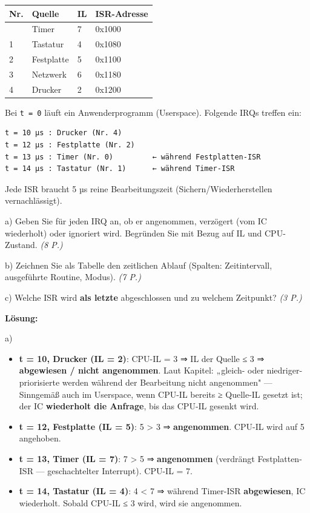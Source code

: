 \documentclass[11pt, a4paper]{article}
\begin{document}
{\small
\begin{tabularx}{\linewidth}{XXXX}
\hline
\rowcolor{tableheadbg}
{\color{white}\textbf{Nr.}} & {\color{white}\textbf{Quelle}} & {\color{white}\textbf{IL}} & {\color{white}\textbf{ISR-Adresse}} \\[2pt]
\hline
\endhead
\hline
\endfoot
0 & Timer & 7 & 0x1000 \\
1 & Tastatur & 4 & 0x1080 \\
2 & Festplatte & 5 & 0x1100 \\
3 & Netzwerk & 6 & 0x1180 \\
4 & Drucker & 2 & 0x1200 \\
\end{tabularx}
}


Bei \texttt{t = 0} läuft ein Anwenderprogramm (Userspace). Folgende IRQs treffen ein:


\begin{lstlisting}
t = 10 µs : Drucker (Nr. 4)
t = 12 µs : Festplatte (Nr. 2)
t = 13 µs : Timer (Nr. 0)         ← während Festplatten-ISR
t = 14 µs : Tastatur (Nr. 1)      ← während Timer-ISR
\end{lstlisting}


Jede ISR braucht 5 µs reine Bearbeitungszeit (Sichern/Wiederherstellen vernachlässigt).


a) Geben Sie für jeden IRQ an, ob er angenommen, verzögert (vom IC wiederholt) oder ignoriert wird. Begründen Sie mit Bezug auf IL und CPU-Zustand. \textit{(8 P.)}


b) Zeichnen Sie als Tabelle den zeitlichen Ablauf (Spalten: Zeitintervall, ausgeführte Routine, Modus). \textit{(7 P.)}


c) Welche ISR wird \textbf{als letzte} abgeschlossen und zu welchem Zeitpunkt? \textit{(3 P.)}


\textbf{Lösung:}


a)

\begin{itemize}
  \item \textbf{t = 10, Drucker (IL = 2)}: CPU-IL = 3 ⇒ IL der Quelle ≤ 3 ⇒ \textbf{abgewiesen / nicht angenommen}. Laut Kapitel: „gleich- oder niedriger-priorisierte werden während der Bearbeitung nicht angenommen" — Sinngemäß auch im Userspace, wenn CPU-IL bereits ≥ Quelle-IL gesetzt ist; der IC \textbf{wiederholt die Anfrage}, bis das CPU-IL gesenkt wird.
  \item \textbf{t = 12, Festplatte (IL = 5)}: 5 > 3 ⇒ \textbf{angenommen}. CPU-IL wird auf 5 angehoben.
  \item \textbf{t = 13, Timer (IL = 7)}: 7 > 5 ⇒ \textbf{angenommen} (verdrängt Festplatten-ISR — geschachtelter Interrupt). CPU-IL = 7.
  \item \textbf{t = 14, Tastatur (IL = 4)}: 4 < 7 ⇒ während Timer-ISR \textbf{abgewiesen}, IC wiederholt. Sobald CPU-IL ≤ 3 wird, wird sie angenommen.
\end{itemize}
\end{document}
